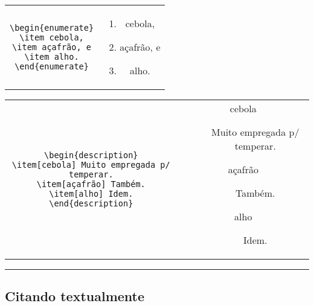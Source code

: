 \begin{center}\footnotesize\smallskip
\begin{tabular}{cc}
\begin{minipage}{.465\textwidth}
\begin{verbatim}
\begin{enumerate}
\item cebola,
\item açafrão, e
\item alho.
\end{enumerate}
\end{verbatim}
\end{minipage} &
\begin{minipage}{.465\textwidth}
\begin{enumerate}
\item cebola,
\item açafrão, e
\item alho.
\end{enumerate}
\end{minipage}
\end{tabular}
\smallskip
\end{center}

\begin{center}\footnotesize\smallskip
\begin{tabular}{cc}
\begin{minipage}{.465\textwidth}
\begin{verbatim}
\begin{description}
\item[cebola] Muito empregada p/ temperar.
\item[açafrão] Também.
\item[alho] Idem.
\end{description}
\end{verbatim}
\end{minipage} &
\begin{minipage}{.465\textwidth}
\begin{description}
\item[cebola] Muito empregada p/ temperar.
\item[açafrão] Também.
\item[alho] Idem.
\end{description}
\end{minipage}
\end{tabular}
\smallskip\hrule
\end{center}

\subsection{Citando textualmente}

